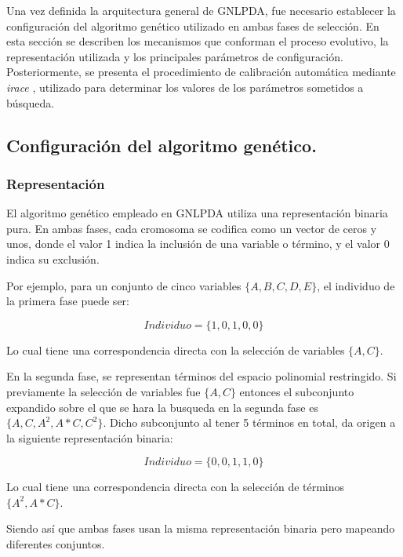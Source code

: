 Una vez definida la arquitectura general de GNLPDA, fue necesario establecer la configuración del algoritmo genético utilizado en ambas fases de selección. En esta sección se describen los mecanismos que conforman el proceso evolutivo, la representación utilizada y los principales parámetros de configuración. Posteriormente, se presenta el procedimiento de calibración automática mediante \textit{irace} \cite{lopez2016irace}, utilizado para determinar los valores de los parámetros sometidos a búsqueda.

\subsection{Configuración del algoritmo genético.}

\subsubsection{Representación}

El algoritmo genético empleado en GNLPDA utiliza una representación binaria pura. En ambas fases, cada cromosoma se codifica como un vector de ceros y unos, donde el valor 1 indica la inclusión de una variable o término, y el valor 0 indica su exclusión.

Por ejemplo, para un conjunto de cinco variables $\{A,B,C,D,E\}$, el individuo de la primera fase puede ser:

\begin{equation}
	Individuo = \{1,0,1,0,0\}
	\label{eq:EMN1}
\end{equation}

Lo cual tiene una correspondencia directa con la selección de variables $\{A,C\}$.

En la segunda fase, se representan términos del espacio polinomial restringido. Si previamente la selección de variables fue $\{A,C\}$ entonces el subconjunto expandido sobre el que se hara la busqueda en la segunda fase es $\{A,C,A^2,A*C,C^2\}$. Dicho subconjunto al tener 5 términos en total, da origen a la siguiente representación binaria:

\begin{equation}
	Individuo = \{0,0,1,1,0\}
	\label{eq:EMN2}
\end{equation}

Lo cual tiene una correspondencia directa con la selección de términos $\{A^2,A*C\}$.

Siendo así que ambas fases usan la misma representación binaria pero mapeando diferentes conjuntos.

